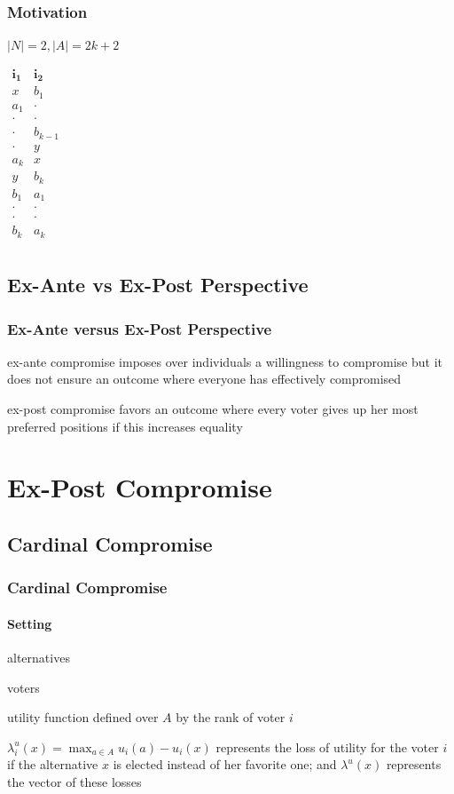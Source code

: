 \documentclass{beamer}
\newcommand{\R}{\mathbb{R}}
\begin{document}
\begin{frame}
 \frametitle{Motivation}
 $|N|=2, |A|=2k+2$
 \begin{center}
 	$
 	\begin{array}{cc}
 	\mathbf{i_1}& \mathbf{i_2} \\
 	x &b_1\\
 	a_1 &\cdot\\
 	\cdot &\cdot\\
 	\cdot &b_{k-1}\\
 	\cdot &y\\
 	a_k &x\\
 	y &b_k\\
 	b_1 &a_1\\
 	\cdot &\cdot\\
 	\cdot &\cdot\\
 	b_k &a_k\\
 	\end{array}
 	$
 	\end{center}
\end{frame}

\subsection{Ex-Ante vs Ex-Post Perspective}
\begin{frame}
	\frametitle{Ex-Ante versus Ex-Post Perspective}
	\begin{block}{ex-ante compromise}
		imposes over individuals a willingness to compromise but it does not ensure an outcome where everyone has effectively compromised 
	\end{block}
	\begin{block}{ex-post compromise}
		favors an outcome where every voter gives up her most preferred positions if this	increases equality 
	\end{block}
\end{frame}

\section{Ex-Post Compromise}
\subsection{Cardinal Compromise}
\begin{frame}
	\frametitle{Cardinal Compromise}
	\framesubtitle{Setting}
	\begin{description}[$u_i \in U(A) \subseteq \R^A$]
		\item[$A$] alternatives
		\item[$N$] voters
		\item[$u_i \in U(A) \subseteq \R^A$] utility function defined over $A$ by the rank of voter $i$ 
	\end{description}
	 \begin{block}{}
		{\color{blue}$\lambda_{i}^u(x) = \max_{a \in A} u_i(a) - u_{i}(x)$} represents the loss of utility for the voter $i$ if the alternative $x$ is elected instead of her favorite one; and {\color{blue}$\lambda ^{u}(x)$} represents the vector of these losses
	\end{block}
\end{frame}
\end{document}
